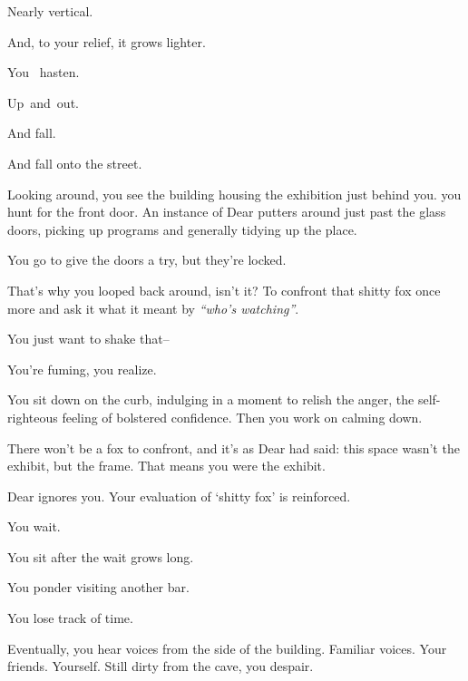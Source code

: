Nearly vertical.

\newpage

\null
\vspace{1in}

And, to your relief, it grows lighter.

\newpage

\null
\vspace{0.5in}

You {\large\ hasten.}

\newpage

{\large Up}{\Large\ and}{\LARGE\ out.}

\newpage

\null
\vfill

\begin{flushright}
  \footnotesize
  And fall.\hspace{1cm}\null
\end{flushright}


\newpage

And fall onto the street.

Looking around, you see the building housing the exhibition just behind you. you hunt for the front door. An instance of Dear putters around just past the glass doors, picking up programs and generally tidying up the place.

You go to give the doors a try, but they're locked.

That's why you looped back around, isn't it? To confront that shitty fox once more and ask it what it meant by \emph{``who's watching''}.

You just want to shake that--

You're fuming, you realize.

You sit down on the curb, indulging in a moment to relish the anger, the self-righteous feeling of bolstered confidence. Then you work on calming down.

There won't be a fox to confront, and it's as Dear had said: this space wasn't the exhibit, but the frame. That means you were the exhibit.

Dear ignores you. Your evaluation of `shitty fox' is reinforced.

You wait.

You sit after the wait grows long.

You ponder visiting another bar.

You lose track of time.

Eventually, you hear voices from the side of the building. Familiar voices. Your friends. Yourself. Still dirty from the cave, you despair.

